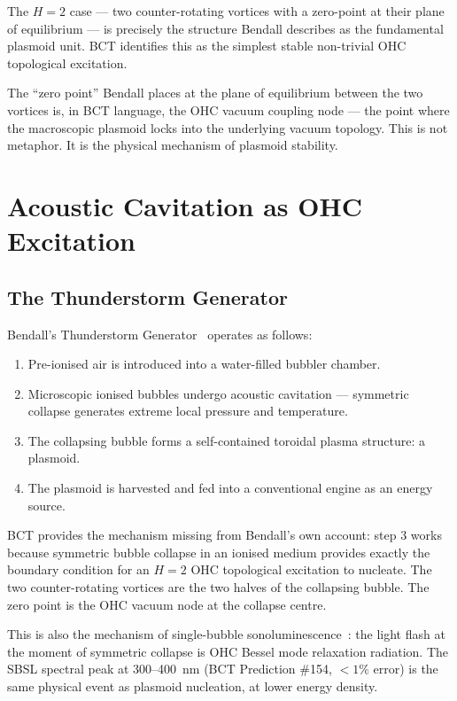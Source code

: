 \documentclass[12pt,twocolumn]{article}
\begin{document}
\medskip
The $H = 2$ case --- two counter-rotating vortices with a
zero-point at their plane of equilibrium --- is precisely
the structure Bendall describes as the fundamental plasmoid
unit. BCT identifies this as the simplest stable non-trivial
OHC topological excitation.

The ``zero point'' Bendall places at the plane of equilibrium
between the two vortices is, in BCT language, the OHC vacuum
coupling node --- the point where the macroscopic plasmoid
locks into the underlying vacuum topology. This is not
metaphor. It is the physical mechanism of plasmoid stability.

\section{Acoustic Cavitation as OHC Excitation}

\subsection{The Thunderstorm Generator}

Bendall's Thunderstorm Generator~\cite{Bendall2022} operates
as follows:

\begin{enumerate}\setlength\itemsep{2pt}
  \item Pre-ionised air is introduced into a water-filled
        bubbler chamber.
  \item Microscopic ionised bubbles undergo acoustic
        cavitation --- symmetric collapse generates
        extreme local pressure and temperature.
  \item The collapsing bubble forms a self-contained
        toroidal plasma structure: a plasmoid.
  \item The plasmoid is harvested and fed into a
        conventional engine as an energy source.
\end{enumerate}

BCT provides the mechanism missing from Bendall's own account:
step 3 works because symmetric bubble collapse in an ionised
medium provides exactly the boundary condition for an $H = 2$
OHC topological excitation to nucleate. The two counter-rotating
vortices are the two halves of the collapsing bubble. The zero
point is the OHC vacuum node at the collapse centre.

This is also the mechanism of single-bubble
sonoluminescence~\cite{BCT_L110}: the light flash at the
moment of symmetric collapse is OHC Bessel mode relaxation
radiation. The SBSL spectral peak at 300--400~nm (BCT
Prediction \#154, $<1\%$ error) is the same physical event
as plasmoid nucleation, at lower energy density.
\end{document}
